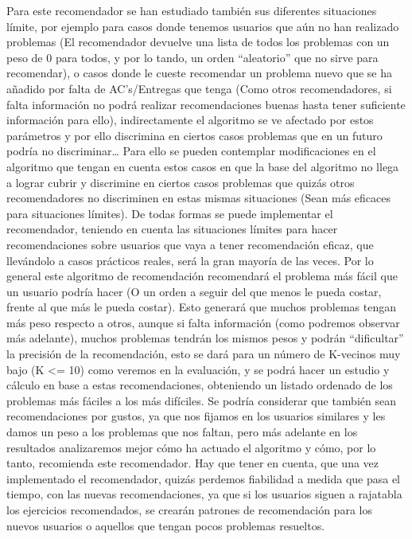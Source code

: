 Para este recomendador se han estudiado también sus diferentes situaciones límite, por ejemplo para casos donde tenemos usuarios que aún no han realizado problemas (El recomendador devuelve una lista de todos los problemas con un peso de 0 para todos, y por lo tando, un orden “aleatorio” que no sirve para recomendar), o casos donde le cueste recomendar un problema nuevo que se ha añadido por falta de AC’s/Entregas que tenga (Como otros recomendadores, si falta información no podrá realizar recomendaciones buenas hasta tener suficiente información para ello), indirectamente el algoritmo se ve afectado por estos parámetros y por ello discrimina en ciertos casos problemas que en un futuro podría no discriminar… Para ello se pueden contemplar modificaciones en el algoritmo que tengan en cuenta estos casos en que la base del algoritmo no llega a lograr cubrir y discrimine en ciertos casos problemas que quizás otros recomendadores no discriminen en estas mismas situaciones (Sean más eficaces para situaciones límites). De todas formas se puede implementar el recomendador, teniendo en cuenta las situaciones límites para hacer recomendaciones sobre usuarios que vaya a tener recomendación eficaz, que llevándolo a casos prácticos reales, será la gran mayoría de las veces. Por lo general este algoritmo de recomendación recomendará el problema más fácil que un usuario podría hacer (O un orden a seguir del que menos le pueda costar, frente al que más le pueda costar). Esto generará que muchos problemas tengan más peso respecto a otros, aunque si falta información (como podremos observar más adelante), muchos problemas tendrán los mismos pesos y podrán “dificultar” la precisión de la recomendación, esto se dará para un número de K-vecinos muy bajo (K <= 10) como veremos en la evaluación, y se podrá hacer un estudio y cálculo en base a estas recomendaciones, obteniendo un listado ordenado de los problemas más fáciles a los más difíciles. Se podría considerar que también sean recomendaciones por gustos, ya que nos fijamos en los usuarios similares y les damos un peso a los problemas que nos faltan, pero más adelante en los resultados analizaremos mejor cómo ha actuado el algoritmo y cómo, por lo tanto, recomienda este recomendador. Hay que tener en cuenta, que una vez implementado el recomendador, quizás perdemos fiabilidad a medida que pasa el tiempo, con las nuevas recomendaciones, ya que si los usuarios siguen a rajatabla los ejercicios recomendados, se crearán patrones de recomendación para los nuevos usuarios o aquellos que tengan pocos problemas resueltos.

